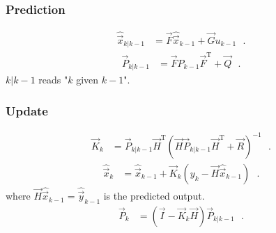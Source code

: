 \subsubsection{Prediction}
\begin{align}
\hat{\vec{x}}_{k|k-1} &= \vec{F} \hat{\vec{x}}_{k-1} + \vec{G} u_{k-1} \ \ \ . \label{eq:predictedState}
\end{align}
%
\begin{align}
\vec{P}_{k|k-1} &= \vec{F} P_{k-1} \vec{F}^\mathrm{T} + \vec{Q}  \ \ \ . \label{eq:predictedStateErrorCovariance}
\end{align}
%
$k|k-1$ reads "$k$ given $k-1$".

\subsubsection{Update}
\begin{align}
\vec{K}_k &= \vec{P}_{k|k-1} \vec{H}^\mathrm{T} ( \vec{H} \vec{P}_{k|k-1} \vec{H}^\mathrm{T} + \vec{R} )^{-1}  \ \ \ . \label{eq:kalmanGain}
\end{align}
%
\begin{align}
\hat{\vec{x}}_k &= \hat{\vec{x}}_{k-1} + \vec{K}_k ( y_k - \vec{H} \hat{\vec{x}}_{k-1} ) \ \ \ . \label{eq:estimatedState}
\end{align}
where $\vec{H} \hat{\vec{x}}_{k-1} = \hat{\vec{y}}_{k-1}$ is the predicted output.
%
\begin{align}
\vec{P}_k &= ( \vec{I} - \vec{K}_k \vec{H} ) \vec{P}_{k|k-1} \ \ \ . \label{eq:stateErrorCovariance}
\end{align}


